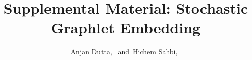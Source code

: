 \documentclass[journal]{IEEEtran}
\theoremstyle{definition}
\begin{document}
%
\title{Supplemental Material: Stochastic Graphlet Embedding}
%
%
%
%

\author{Anjan Dutta,~ 
        and~Hichem Sahbi,~

}

% 
%
\end{document}
